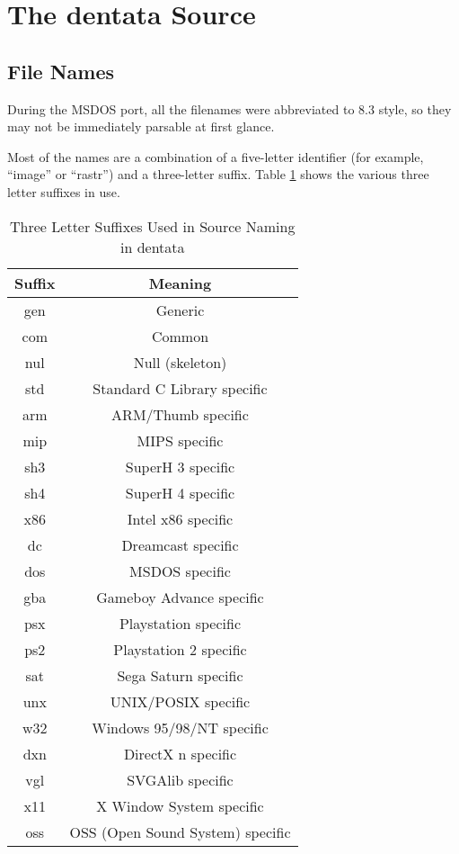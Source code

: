 %
% 
% 
\def\FileCreated{Sat Jun 23 00:06:03 2001}
\def\FileRevised{Sun Jun 24 07:39:26 2001}

\section{The dentata Source}

\subsection{File Names}

During the MSDOS port, all the filenames were abbreviated to
8.3 style, so they may not be immediately parsable at first
glance.

Most of the names are a combination of a five-letter identifier
(for example, ``image'' or ``rastr'') and a three-letter suffix.
Table \ref{tab:tlsuffixes} shows the various three letter suffixes
in use.

\begin{table}[hpt]
\caption{Three Letter Suffixes Used in Source Naming in dentata}
\label{tab:tlsuffixes}
\begin{tabular}{|c|c|}
\hline
Suffix & Meaning \\
\hline\hline
gen & Generic \\
com & Common \\
nul & Null (skeleton) \\
std & Standard C Library specific \\
\hline\hline
arm & ARM/Thumb specific \\
mip & MIPS specific \\
sh3 & SuperH 3 specific \\
sh4 & SuperH 4 specific \\
x86 & Intel x86 specific \\
\hline\hline
dc & Dreamcast specific \\
dos & MSDOS specific \\
gba & Gameboy Advance specific \\
psx & Playstation specific \\
ps2 & Playstation 2 specific \\
sat & Sega Saturn specific \\
unx & UNIX/POSIX specific \\
w32 & Windows 95/98/NT specific \\
\hline\hline
dxn & DirectX n specific \\
vgl & SVGAlib specific \\
x11 & X Window System specific \\
oss & OSS (Open Sound System) specific \\
\hline
\end{tabular}
\end{table}

